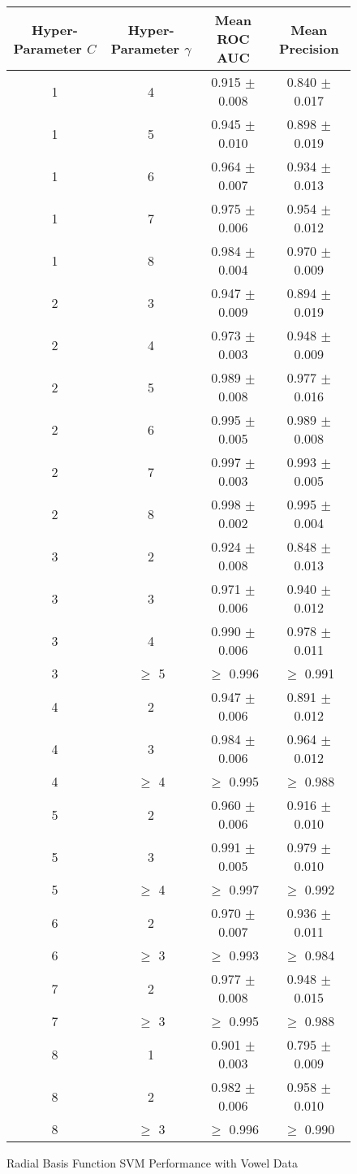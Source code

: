\documentclass[tikz]{article}
\begin{document}
\begin{figure}[H]
\centering
\begin{tabular}{|c|c|c|c|}
\hline
Hyper-Parameter $C$ & Hyper-Parameter $\gamma$ & Mean ROC AUC & Mean Precision \\
\hline
1 & 4 & 0.915 $\pm$ 0.008 & 0.840 $\pm$ 0.017 \\
\hline
1 & 5 & 0.945 $\pm$ 0.010 & 0.898 $\pm$ 0.019 \\
\hline
1 & 6 & 0.964 $\pm$ 0.007 & 0.934 $\pm$ 0.013 \\
\hline
1 & 7 & 0.975 $\pm$ 0.006 & 0.954 $\pm$ 0.012 \\
\hline
1 & 8 & 0.984 $\pm$ 0.004 & 0.970 $\pm$ 0.009 \\
\hline
2 & 3 & 0.947 $\pm$ 0.009 & 0.894 $\pm$ 0.019 \\
\hline
2 & 4 & 0.973 $\pm$ 0.003 & 0.948 $\pm$ 0.009 \\
\hline
2 & 5 & 0.989 $\pm$ 0.008 & 0.977 $\pm$ 0.016 \\
\hline
2 & 6 & 0.995 $\pm$ 0.005 & 0.989 $\pm$ 0.008 \\
\hline
2 & 7 & 0.997 $\pm$ 0.003 & 0.993 $\pm$ 0.005 \\
\hline
2 & 8 & 0.998 $\pm$ 0.002 & 0.995 $\pm$ 0.004 \\
\hline
3 & 2 & 0.924 $\pm$ 0.008 & 0.848 $\pm$ 0.013 \\
\hline
3 & 3 & 0.971 $\pm$ 0.006 & 0.940 $\pm$ 0.012 \\
\hline
3 & 4 & 0.990 $\pm$ 0.006 & 0.978 $\pm$ 0.011 \\
\hline
3 & $\geq$ 5 & $\geq$ 0.996 & $\geq$ 0.991 \\
\hline
4 & 2 & 0.947 $\pm$ 0.006 & 0.891 $\pm$ 0.012 \\
\hline
4 & 3 & 0.984 $\pm$ 0.006 & 0.964 $\pm$ 0.012 \\
\hline
4 & $\geq$ 4 & $\geq$ 0.995 & $\geq$ 0.988 \\
\hline
5 & 2 & 0.960 $\pm$ 0.006 & 0.916 $\pm$ 0.010 \\
\hline
5 & 3 & 0.991 $\pm$ 0.005 & 0.979 $\pm$ 0.010 \\
\hline
5 & $\geq$ 4 & $\geq$ 0.997 & $\geq$ 0.992 \\
\hline
6 & 2 & 0.970 $\pm$ 0.007 & 0.936 $\pm$ 0.011 \\
\hline
6 & $\geq$ 3 & $\geq$ 0.993 & $\geq$ 0.984 \\
\hline
7 & 2 & 0.977 $\pm$ 0.008 & 0.948 $\pm$ 0.015 \\
\hline
7 & $\geq$ 3 & $\geq$ 0.995 & $\geq$ 0.988 \\
\hline
8 & 1 & 0.901 $\pm$ 0.003 & 0.795 $\pm$ 0.009 \\
\hline
8 & 2 & 0.982 $\pm$ 0.006 & 0.958 $\pm$ 0.010 \\
\hline
8 & $\geq$ 3 & $\geq$ 0.996 & $\geq$ 0.990 \\
\hline
\end{tabular}
\caption{Radial Basis Function SVM Performance with Vowel Data}
\label{fig:vowel_rbf_2}
\end{figure}
\end{document}
